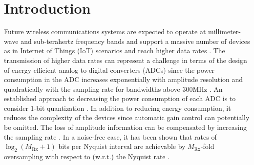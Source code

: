 \section{Introduction}

Future wireless communications systems are expected to operate at millimeter-wave and sub-terahertz frequency bands and support a massive number of devices \cite{Rappaport2019} as in Internet of Things (IoT) scenarios \cite{Gupta_2015} and reach higher data rates \cite{Viswanathan_2020}. The transmission of higher data rates can represent a challenge in terms of the design of energy-efficient analog
to-digital converters (ADCs) since the power consumption in the ADC increases exponentially with amplitude resolution \cite{Murmann_2009} and quadratically with the sampling rate for bandwidths above 300MHz \cite{Murmann_ADC,cqabd}.
An established approach to decreasing the power consumption of each ADC is to consider 1-bit quantization \cite{bbprec,1bitidd,dqalms,dqarls,dynovs,comp}. In addition to reducing energy consumption, it reduces the complexity of the devices since automatic gain control can potentially be omitted. The loss of amplitude information can be compensated by increasing the sampling rate \cite{Gilbert_1993}. In a noise-free case, it has been shown that rates of $\log_2(M_\mathrm{Rx}+1)$ bits per Nyquist interval are achievable by $M_\mathrm{Rx}$-fold oversampling with respect to (w.r.t.) the Nyquist rate \cite{Shamai2_1994}.

